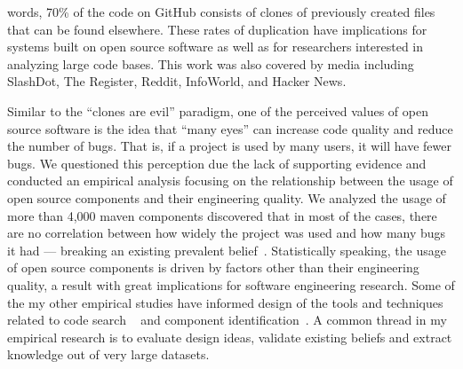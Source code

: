 \documentclass[a4paper]{article}
\begin{document}
words, 70\% of the code on GitHub consists of clones of previously created files that can be found elsewhere. These rates
of duplication have implications for systems built on open source software as well as for researchers interested
in analyzing large code bases. This work was also covered by media including SlashDot, The Register, Reddit, InfoWorld,
and Hacker News.

Similar to the \enquote{clones are evil} paradigm, one of the perceived values of open source software is the idea that \enquote{many eyes} can increase code quality and reduce the number
of bugs. That is, if a project is used by many users, it will have fewer bugs. We
questioned this perception due the lack of supporting evidence and conducted an
empirical analysis focusing on the relationship between the usage of open source
components and their engineering quality. We analyzed the usage of more than 4,000 maven components discovered that
in most of the cases, there are no correlation between how widely the project was used
and how many bugs it had --- breaking an existing prevalent belief~\cite{quality-popularity}. Statistically speaking,
the usage of open source components is driven by factors other than their engineering
quality, a result with great implications for software engineering research. 
Some of the my other empirical studies have informed design of the tools and techniques related to code search ~\cite{codesearch, interfaceredundancy} and component identification~\cite{astra}. 
A common thread in my empirical research is to evaluate design ideas, validate existing beliefs and extract knowledge out of very large datasets.
\end{document}

